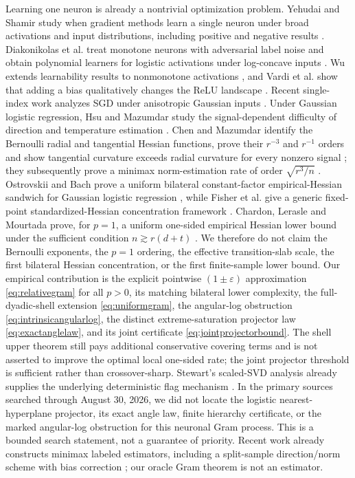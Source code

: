 \documentclass[11pt]{article}
\begin{document}
Learning one neuron is already a nontrivial optimization problem.  Yehudai and Shamir study when gradient methods
learn a single neuron under broad activations and input distributions, including positive and negative results
\cite{yehudai2020}.  Diakonikolas et al. treat monotone neurons with adversarial label noise and obtain polynomial
learners for logistic activations under log-concave inputs \cite{diakonikolas2022}.  Wu extends learnability results to
nonmonotone activations \cite{wu2022}, and Vardi et al. show that adding a bias qualitatively changes the ReLU
landscape \cite{vardi2021}.  Recent single-index work analyzes SGD under anisotropic Gaussian inputs
\cite{braun2025}.  Under Gaussian logistic regression, Hsu and Mazumdar study the signal-dependent difficulty of
direction and temperature estimation \cite{hsu2024}.  Chen and Mazumdar identify the Bernoulli radial and
tangential Hessian functions, prove their $r^{-3}$ and $r^{-1}$ orders and show tangential curvature exceeds radial
curvature for every nonzero signal \cite{chen2026gd}; they subsequently prove a minimax norm-estimation rate of
order $\sqrt{r^3/n}$ \cite{chen2026minimax}.  Ostrovskii and Bach prove a uniform bilateral constant-factor
empirical-Hessian sandwich for Gaussian logistic regression \cite[Eq.~(92)]{ostrovskii2021}, while Fisher et al.
give a generic fixed-point standardized-Hessian concentration framework \cite{fisher2023}.  Chardon, Lerasle and
Mourtada prove, for $p=1$, a uniform one-sided empirical Hessian lower bound under the sufficient condition
$n\gtrsim r(d+t)$ \cite[Theorem 6]{chardon2024}.  We therefore do not claim the Bernoulli exponents, the $p=1$
ordering, the effective transition-slab scale, the first bilateral Hessian concentration, or the first finite-sample
lower bound.  Our empirical contribution is the explicit pointwise $(1\pm\varepsilon)$ approximation
\eqref{eq:relativegram} for all $p>0$, its matching bilateral lower complexity, the full-dyadic-shell extension
\eqref{eq:uniformgram}, the angular-log obstruction \eqref{eq:intrinsicangularlog}, the distinct
extreme-saturation projector law \eqref{eq:exactanglelaw}, and its joint certificate
\eqref{eq:jointprojectorbound}.  The shell upper theorem still pays additional conservative covering terms and is
not asserted to improve the optimal local one-sided rate; the joint projector threshold is sufficient rather than
crossover-sharp.  Stewart's
scaled-SVD analysis already supplies the underlying deterministic flag mechanism \cite{stewart1984}.  In the primary
sources searched through August 30, 2026, we did not locate the logistic nearest-hyperplane projector, its exact
angle law, finite hierarchy certificate, or the marked angular-log obstruction for this neuronal Gram process.
This is a bounded search statement, not a guarantee of priority.  Recent work already constructs minimax labeled estimators, including a split-sample
direction/norm scheme with bias correction \cite{chen2026minimax}; our oracle Gram theorem is not an estimator.
\end{document}
